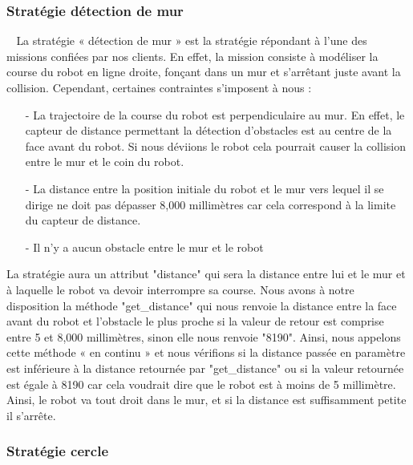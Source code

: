 \documentclass[12pt]{article}
\def\tab{$\>\>\>\>$}
\begin{document}
\subsubsection{Stratégie détection de mur}
\tab La stratégie « détection de mur » est la stratégie répondant à l’une des missions confiées par nos clients. En effet, la mission consiste à modéliser la course du robot en ligne droite, fonçant dans un mur et s’arrêtant juste avant la collision.
Cependant, certaines contraintes s’imposent à nous : \begin{itemize}
\item[-] La trajectoire de la course du robot est perpendiculaire au mur. En effet, le capteur de distance permettant la détection d’obstacles est au centre de la face avant du robot. Si nous déviions le robot cela pourrait causer la collision entre le mur et le coin du robot.
\item[-] La distance entre la position initiale du robot et le mur vers lequel il se dirige ne doit pas dépasser 8,000 millimètres car cela correspond à la limite du capteur de distance.
\item[-] Il n’y a aucun obstacle entre le mur et le robot
\end{itemize}
La stratégie aura un attribut "distance" qui sera la distance entre lui et le mur et à laquelle le robot va devoir interrompre sa course.
Nous avons à notre disposition la méthode "get\_distance" qui nous renvoie la distance entre la face avant du robot et l’obstacle le plus proche si la valeur de retour est comprise entre 5 et 8,000 millimètres, sinon elle nous renvoie "8190". Ainsi, nous appelons cette méthode « en continu » et nous vérifions si la distance passée en paramètre est inférieure à la distance retournée par "get\_distance" ou si la valeur retournée est égale à 8190 car cela voudrait dire que le robot est à moins de 5 millimètre.
Ainsi, le robot va tout droit dans le mur, et si la distance est suffisamment petite il s’arrête.

\subsubsection{Stratégie cercle}
\end{document}
